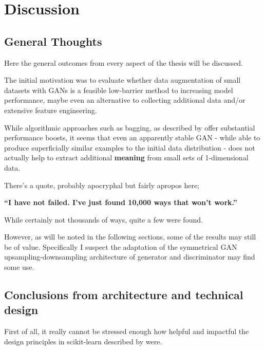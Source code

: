 \chapter{Discussion}
\label{chapter:discussion}

\section{General Thoughts}

Here the general outcomes from every aspect of the thesis will be discussed.

The initial motivation was to evaluate whether data augmentation of small datasets with \acp{GAN} is a feasible low-barrier method to increasing model performance, maybe even an alternative to collecting additional data and/or extensive feature engineering.

While algorithmic approaches such as \ac{bagging}, as described by \cite{bagging} offer substantial performance boosts, it seems that even an apparently stable \ac{GAN} - while able to produce superficially similar examples to the initial data distribution - does not actually help to extract additional \textbf{meaning} from small sets of 1-dimensional data.

There's a quote, probably apocryphal but fairly apropos here;

\begin{center} 
	
	\textbf{“I have not failed. I’ve just found 10,000 ways that won’t work.”}
	
\end{center}

While certainly not thousands of ways, quite a few were found.

However, as will be noted in the following sections, some of the results may still be of value. Specifically I suspect the adaptation of the symmetrical \ac{GAN} upsampling-downsampling architecture of generator and discriminator may find some use.

\pagebreak

\section{Conclusions from architecture and technical design}

First of all, it really cannot be stressed enough how helpful and impactful the design principles in scikit-learn described by \cite{buitinck2013api} were. 


